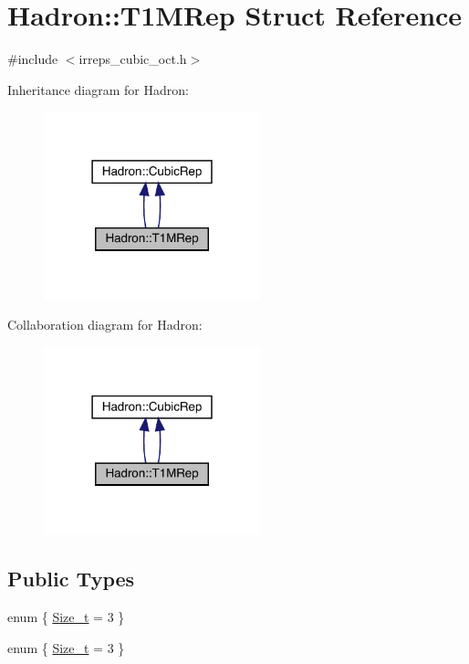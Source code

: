 \hypertarget{structHadron_1_1T1MRep}{}\section{Hadron\+:\+:T1\+M\+Rep Struct Reference}
\label{structHadron_1_1T1MRep}


{\ttfamily \#include $<$irreps\+\_\+cubic\+\_\+oct.\+h$>$}



Inheritance diagram for Hadron\+:\nopagebreak
\begin{figure}[H]
\begin{center}
\leavevmode
\includegraphics[width=178pt]{d6/d10/structHadron_1_1T1MRep__inherit__graph}
\end{center}
\end{figure}


Collaboration diagram for Hadron\+:\nopagebreak
\begin{figure}[H]
\begin{center}
\leavevmode
\includegraphics[width=178pt]{de/d08/structHadron_1_1T1MRep__coll__graph}
\end{center}
\end{figure}
\subsection*{Public Types}
\begin{DoxyCompactItemize}
\item 
enum \{ \mbox{\hyperlink{structHadron_1_1T1MRep_a6e798ea02cc3ffd5502525d251d152c8a58d6b01db078a0bdeff5761be3766496}{Size\+\_\+t}} = 3
 \}
\item 
enum \{ \mbox{\hyperlink{structHadron_1_1T1MRep_a6e798ea02cc3ffd5502525d251d152c8a58d6b01db078a0bdeff5761be3766496}{Size\+\_\+t}} = 3
 \}
\end{DoxyCompactItemize}
